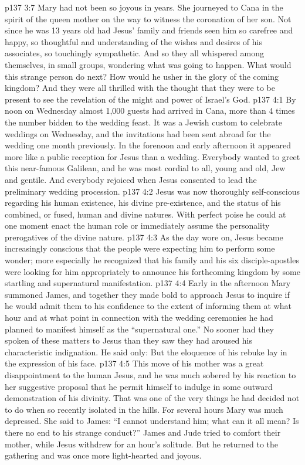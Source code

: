 \vs p137 3:7 Mary had not been so joyous in years. She journeyed to Cana in the spirit of the queen mother on the way to witness the coronation of her son. Not since he was 13 years old had Jesus’ family and friends seen him so carefree and happy, so thoughtful and understanding of the wishes and desires of his associates, so touchingly sympathetic. And so they all whispered among themselves, in small groups, wondering what was going to happen. What would this strange person do next? How would he usher in the glory of the coming kingdom? And they were all thrilled with the thought that they were to be present to see the revelation of the might and power of Israel’s God.
\vs p137 4:1 By noon on Wednesday almost 1,000 guests had arrived in Cana, more than 4 times the number bidden to the wedding feast. It was a Jewish custom to celebrate weddings on Wednesday, and the invitations had been sent abroad for the wedding one month previously. In the forenoon and early afternoon it appeared more like a public reception for Jesus than a wedding. Everybody wanted to greet this near\hyp{}famous Galilean, and he was most cordial to all, young and old, Jew and gentile. And everybody rejoiced when Jesus consented to lead the preliminary wedding procession.
\vs p137 4:2 Jesus was now thoroughly self\hyp{}conscious regarding his human existence, his divine pre\hyp{}existence, and the status of his combined, or fused, human and divine natures. With perfect poise he could at one moment enact the human role or immediately assume the personality prerogatives of the divine nature.
\vs p137 4:3 As the day wore on, Jesus became increasingly conscious that the people were expecting him to perform some wonder; more especially he recognized that his family and his six disciple\hyp{}apostles were looking for him appropriately to announce his forthcoming kingdom by some startling and supernatural manifestation.
\vs p137 4:4 Early in the afternoon Mary summoned James, and together they made bold to approach Jesus to inquire if he would admit them to his confidence to the extent of informing them at what hour and at what point in connection with the wedding ceremonies he had planned to manifest himself as the “supernatural one.” No sooner had they spoken of these matters to Jesus than they saw they had aroused his characteristic indignation. He said only:  But the eloquence of his rebuke lay in the expression of his face.
\vs p137 4:5 This move of his mother was a great disappointment to the human Jesus, and he was much sobered by his reaction to her suggestive proposal that he permit himself to indulge in some outward demonstration of his divinity. That was one of the very things he had decided not to do when so recently isolated in the hills. For several hours Mary was much depressed. She said to James: “I cannot understand him; what can it all mean? Is there no end to his strange conduct?” James and Jude tried to comfort their mother, while Jesus withdrew for an hour’s solitude. But he returned to the gathering and was once more light\hyp{}hearted and joyous.
